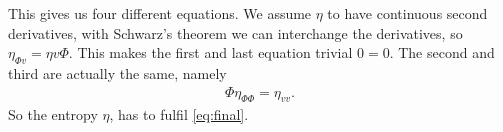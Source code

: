 This gives us four different equations. We assume $\eta$ to have continuous second derivatives, with Schwarz's theorem we can interchange the derivatives, so $\eta_{\Phi v} = \eta{v\Phi}$. This makes the first and last equation trivial $0 = 0$. The second and third are actually the same, namely 
\begin{align}
\Phi \eta_{\Phi\Phi} = \eta_{vv}.\label{eq:final}
\end{align}
So the entropy $\eta$, has to fulfil \cref{eq:final}.